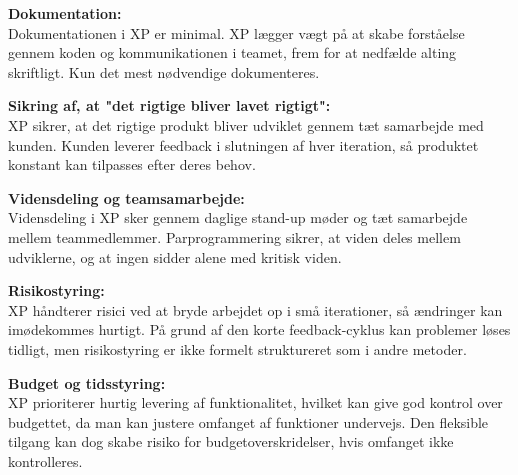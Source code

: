 \textbf{Dokumentation:}\\
Dokumentationen i XP er minimal. XP lægger vægt på at skabe forståelse gennem koden og kommunikationen i teamet, frem for at nedfælde alting skriftligt. Kun det mest nødvendige dokumenteres.

\textbf{Sikring af, at "det rigtige bliver lavet rigtigt":}\\
XP sikrer, at det rigtige produkt bliver udviklet gennem tæt samarbejde med kunden. Kunden leverer feedback i slutningen af hver iteration, så produktet konstant kan tilpasses efter deres behov.

\textbf{Vidensdeling og teamsamarbejde:}\\
Vidensdeling i XP sker gennem daglige stand-up møder og tæt samarbejde mellem teammedlemmer. Parprogrammering sikrer, at viden deles mellem udviklerne, og at ingen sidder alene med kritisk viden.

\textbf{Risikostyring:}\\
XP håndterer risici ved at bryde arbejdet op i små iterationer, så ændringer kan imødekommes hurtigt. På grund af den korte feedback-cyklus kan problemer løses tidligt, men risikostyring er ikke formelt struktureret som i andre metoder.

\textbf{Budget og tidsstyring:}\\
XP prioriterer hurtig levering af funktionalitet, hvilket kan give god kontrol over budgettet, da man kan justere omfanget af funktioner undervejs. Den fleksible tilgang kan dog skabe risiko for budgetoverskridelser, hvis omfanget ikke kontrolleres.